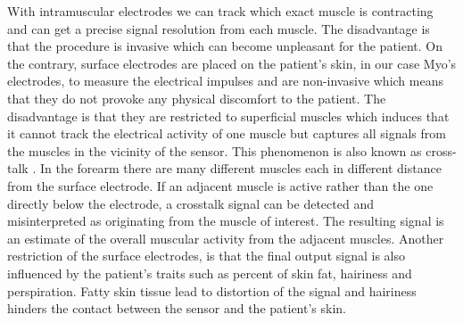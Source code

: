 With intramuscular electrodes we can track which exact muscle is contracting and can get a precise signal resolution from each muscle. The disadvantage is that the procedure is invasive which can become unpleasant for the patient. On the contrary, surface electrodes are placed on the patient's skin, in our case Myo's electrodes, to measure the electrical impulses and are non-invasive which means that they do not provoke any physical discomfort to the patient. The disadvantage is that they are restricted to superficial muscles which induces that it cannot track the electrical activity of one muscle but captures all signals from the muscles in the vicinity of the sensor. This phenomenon is also known as cross-talk \cite{winter_crosstalk_1994}. In the forearm there are many different muscles each in different distance from the surface electrode. If an adjacent muscle is active rather than the one directly below the electrode, a crosstalk signal can be detected and misinterpreted as originating from the muscle of interest. The resulting signal is an estimate of the overall muscular activity from the adjacent muscles. Another restriction of the surface electrodes, is that the final output signal is also influenced by the patient's traits such as percent of skin fat, hairiness and perspiration. Fatty skin tissue lead to distortion of the signal and hairiness hinders the contact between the sensor and the patient's skin.\\
